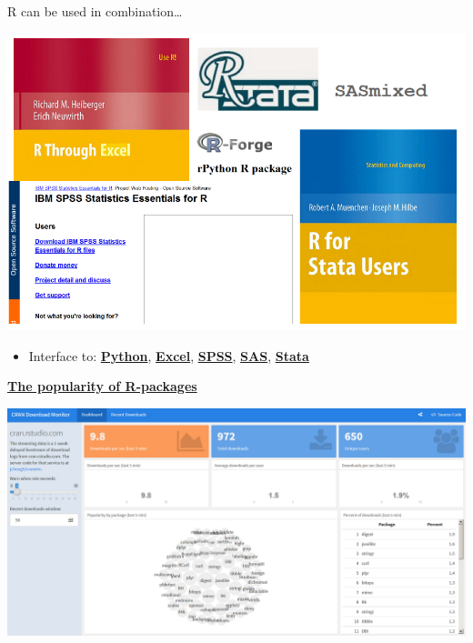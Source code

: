 \documentclass[
  10pt,
  ignorenonframetext,
]{beamer}
\providecommand{\tightlist}{%
  \setlength{\itemsep}{0pt}\setlength{\parskip}{0pt}}
\begin{document}
\begin{frame}{R can be used in combination\ldots{}}
\protect\hypertarget{r-can-be-used-in-combination}{}

\includegraphics{figure/Rinterfaces.PNG}

\begin{itemize}
\tightlist
\item
  Interface to:
  \href{https://cran.r-project.org/web/packages/reticulate/vignettes/calling_python.html}{\textbf{Python}},
  \href{https://www.springer.com/de/book/9781441900517}{\textbf{Excel}},
  \href{https://www.ibm.com/support/knowledgecenter/en/SSFUEU_7.2.0/com.ibm.swg.ba.cognos.op_capmod_ig.7.2.0.doc/t_essentials_for_r_statistics.html}{\textbf{SPSS}},
  \href{https://cran.r-project.org/web/packages/SASmixed/index.html}{\textbf{SAS}},
  \href{https://cran.r-project.org/web/packages/RStata/index.html}{\textbf{Stata}}
\end{itemize}

\end{frame}

\begin{frame}{\href{https://gallery.shinyapps.io/cran-gauge/}{\textbf{The
popularity of R-packages}}}
\protect\hypertarget{the-popularity-of-r-packages}{}

\includegraphics{figure/CRANdownloads.PNG}

\end{frame}
\end{document}
